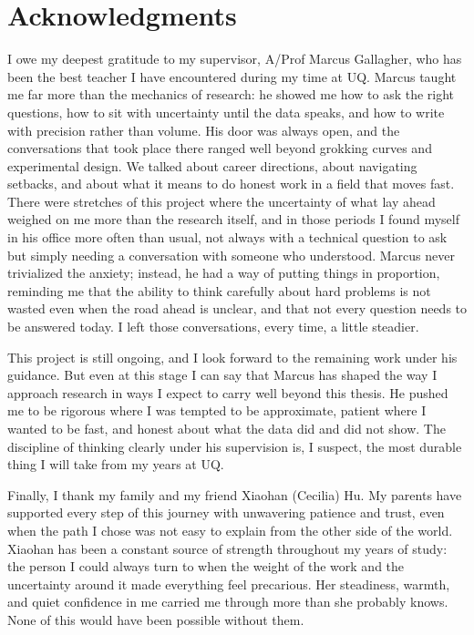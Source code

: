 \documentclass[12pt,openany,a4paper]{book}
\begin{document}
\chapter{Acknowledgments}

I owe my deepest gratitude to my supervisor, A/Prof Marcus Gallagher, who has been the best teacher I have encountered during my time at UQ. Marcus taught me far more than the mechanics of research: he showed me how to ask the right questions, how to sit with uncertainty until the data speaks, and how to write with precision rather than volume. His door was always open, and the conversations that took place there ranged well beyond grokking curves and experimental design. We talked about career directions, about navigating setbacks, and about what it means to do honest work in a field that moves fast. There were stretches of this project where the uncertainty of what lay ahead weighed on me more than the research itself, and in those periods I found myself in his office more often than usual, not always with a technical question to ask but simply needing a conversation with someone who understood. Marcus never trivialized the anxiety; instead, he had a way of putting things in proportion, reminding me that the ability to think carefully about hard problems is not wasted even when the road ahead is unclear, and that not every question needs to be answered today. I left those conversations, every time, a little steadier.

This project is still ongoing, and I look forward to the remaining work under his guidance. But even at this stage I can say that Marcus has shaped the way I approach research in ways I expect to carry well beyond this thesis. He pushed me to be rigorous where I was tempted to be approximate, patient where I wanted to be fast, and honest about what the data did and did not show. The discipline of thinking clearly under his supervision is, I suspect, the most durable thing I will take from my years at UQ.

Finally, I thank my family and my friend Xiaohan (Cecilia) Hu. My parents have supported every step of this journey with unwavering patience and trust, even when the path I chose was not easy to explain from the other side of the world. Xiaohan has been a constant source of strength throughout my years of study: the person I could always turn to when the weight of the work and the uncertainty around it made everything feel precarious. Her steadiness, warmth, and quiet confidence in me carried me through more than she probably knows. None of this would have been possible without them.
\end{document}
